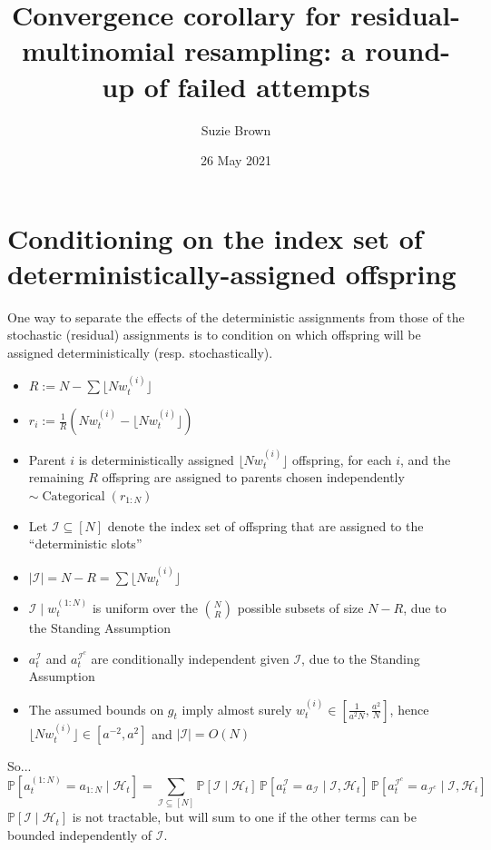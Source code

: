 \documentclass{article}
\title{Convergence corollary for residual-multinomial resampling: a round-up of failed attempts}
\author{Suzie Brown}
\date{26 May 2021}
\newcommand{\Prob}{\mathbb{P}}
\newcommand{\1}[1]{\mathbbm{1}_{#1}}
\newcommand{\flnw}[1][i]{\lfloor N w_t^{(#1)} \rfloor}
\newcommand{\Cat}{\operatorname{Categorical}}
\begin{document}
\maketitle
\thispagestyle{fancy}


\section{Conditioning on the index set of deterministically-assigned offspring}

One way to separate the effects of the deterministic assignments from those of the stochastic (residual) assignments is to condition on which offspring will be assigned deterministically (resp. stochastically).\\

\begin{itemize}
\item $R:= N - \sum \flnw$ 
\item $r_i := \frac{1}{R} ( Nw_t^{(i)} - \flnw )$
\item Parent $i$ is deterministically assigned $\flnw$ offspring, for each $i$, and the remaining $R$ offspring are assigned to parents chosen independently $\sim \Cat(r_{1:N})$
\item Let $\mathcal{I} \subseteq [N]$ denote the index set of offspring that are assigned to the ``deterministic slots''
\item $|\mathcal{I}| = N-R = \sum \flnw$
\item $\mathcal{I} \mid w_t^{(1:N)}$ is uniform over the $\binom{N}{R}$ possible subsets of size $N-R$, due to the Standing Assumption
\item $a_t^{\mathcal{I}}$ and $a_t^{\mathcal{I}^c}$ are conditionally independent given $\mathcal{I}$, due to the Standing Assumption
\item The assumed bounds on $g_t$ imply almost surely $w_t^{(i)} \in [ \frac{1}{a^2 N}, \frac{a^2}{N} ]$, hence $\flnw \in [a^{-2}, a^2] $ and $|\mathcal{I}|= O(N)$
\end{itemize}
So...
\begin{equation}
\Prob[ a_t^{(1:N)} = a_{1:N} \mid \mathcal{H}_t ]
= \sum_{\mathcal{I}\subseteq[N]} \Prob[ \mathcal{I} \mid \mathcal{H}_t ]
        \, \Prob[ a_t^{\mathcal{I}} = a_{\mathcal{I}} \mid \mathcal{I}, \mathcal{H}_t ]
        \, \Prob[ a_t^{\mathcal{I}^c} = a_{\mathcal{I}^c} \mid \mathcal{I}, \mathcal{H}_t ]
\end{equation}
$\Prob[ \mathcal{I} \mid \mathcal{H}_t ]$ is not tractable, but will sum to one if the other terms can be bounded independently of $\mathcal{I}$.
\end{document}
